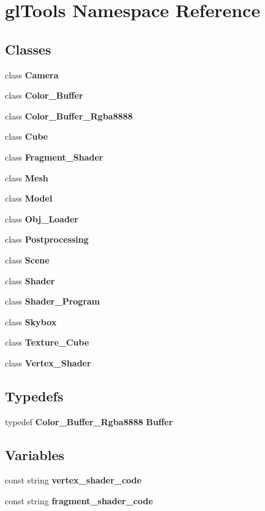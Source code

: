 \section{gl\+Tools Namespace Reference}
\label{namespacegl_tools}
\subsection*{Classes}
\begin{DoxyCompactItemize}
\item 
class \textbf{ Camera}
\item 
class \textbf{ Color\+\_\+\+Buffer}
\item 
class \textbf{ Color\+\_\+\+Buffer\+\_\+\+Rgba8888}
\item 
class \textbf{ Cube}
\item 
class \textbf{ Fragment\+\_\+\+Shader}
\item 
class \textbf{ Mesh}
\item 
class \textbf{ Model}
\item 
class \textbf{ Obj\+\_\+\+Loader}
\item 
class \textbf{ Postprocessing}
\item 
class \textbf{ Scene}
\item 
class \textbf{ Shader}
\item 
class \textbf{ Shader\+\_\+\+Program}
\item 
class \textbf{ Skybox}
\item 
class \textbf{ Texture\+\_\+\+Cube}
\item 
class \textbf{ Vertex\+\_\+\+Shader}
\end{DoxyCompactItemize}
\subsection*{Typedefs}
\begin{DoxyCompactItemize}
\item 
typedef \textbf{ Color\+\_\+\+Buffer\+\_\+\+Rgba8888} \textbf{ Buffer}
\end{DoxyCompactItemize}
\subsection*{Variables}
\begin{DoxyCompactItemize}
\item 
const string \textbf{ vertex\+\_\+shader\+\_\+code}
\item 
const string \textbf{ fragment\+\_\+shader\+\_\+code}
\end{DoxyCompactItemize}


